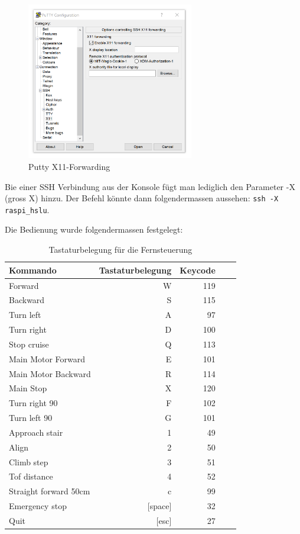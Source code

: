 \begin{figure}[H]
  \includegraphics[width=0.65\textwidth]{img/remote_control/putty_x11.PNG}
  \centering
  \caption{Putty X11-Forwarding}
  \label{fig:putty_x11_forwarding}
\end{figure}

\newpage

Bie einer SSH Verbindung aus der Konsole fügt man lediglich den Parameter -X (gross X) hinzu. Der Befehl könnte dann folgendermassen aussehen: \texttt{ssh -X raspi\_hslu}.

Die Bedienung wurde folgendermassen festgelegt:
\begin{center}
\begin{table}[H]
\begin{tabular}{|l|r|r|r|r|}
\hline
\textbf{Kommando} & \textbf{Tastaturbelegung} &
\textbf{Keycode}\\
\hline
Forward & W & 119\\
\hline
Backward & S & 115\\
\hline
Turn left & A & 97\\
\hline
Turn right & D & 100\\
\hline
Stop cruise & Q & 113\\
\hline
Main Motor Forward & E & 101\\ 
\hline
Main Motor Backward & R & 114\\ 
\hline
Main Stop & X & 120\\ 
\hline
Turn right 90 & F & 102\\ 
\hline
Turn left 90 & G & 101\\ 
\hline
Approach stair & 1 & 49\\ 
\hline
Align & 2 & 50\\ 
\hline
Climb step & 3 & 51\\ 
\hline
Tof distance & 4 & 52\\ 
\hline
Straight forward 50cm & c & 99\\ 
\hline
Emergency stop & [space] & 32\\ 
\hline
Quit & [esc] & 27\\ 
\hline
\end{tabular}
\caption[Tastaturbelegung für die Fernsteuerung]{Tastaturbelegung für die Fernsteuerung}
\label{tab:entwicklungsaufwand}
\end{table}
\end{center}


